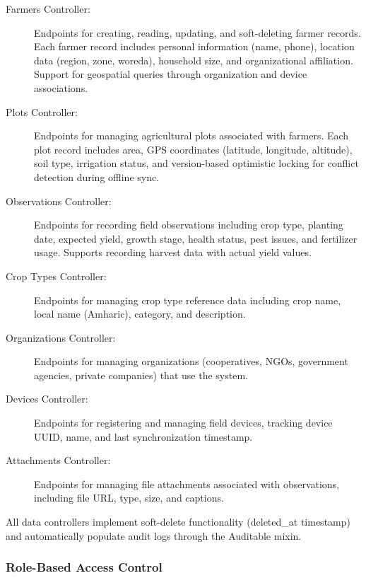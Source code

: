 \begin{description}
  \item[Farmers Controller:] Endpoints for creating, reading, updating, and soft-deleting farmer records. Each farmer record includes personal information (name, phone), location data (region, zone, woreda), household size, and organizational affiliation. Support for geospatial queries through organization and device associations.
  
  \item[Plots Controller:] Endpoints for managing agricultural plots associated with farmers. Each plot record includes area, GPS coordinates (latitude, longitude, altitude), soil type, irrigation status, and version-based optimistic locking for conflict detection during offline sync.
  
  \item[Observations Controller:] Endpoints for recording field observations including crop type, planting date, expected yield, growth stage, health status, pest issues, and fertilizer usage. Supports recording harvest data with actual yield values.
  
  \item[Crop Types Controller:] Endpoints for managing crop type reference data including crop name, local name (Amharic), category, and description.
  
  \item[Organizations Controller:] Endpoints for managing organizations (cooperatives, NGOs, government agencies, private companies) that use the system.
  
  \item[Devices Controller:] Endpoints for registering and managing field devices, tracking device UUID, name, and last synchronization timestamp.
  
  \item[Attachments Controller:] Endpoints for managing file attachments associated with observations, including file URL, type, size, and captions.
\end{description}

All data controllers implement soft-delete functionality (deleted\_at timestamp) and automatically populate audit logs through the Auditable mixin.

\subsubsection{Role-Based Access Control}

